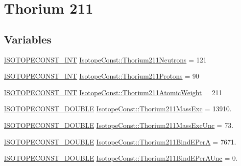 \hypertarget{group___isotope_const-_thorium-_th211}{}\section{Thorium 211}
\label{group___isotope_const-_thorium-_th211}
\subsection*{Variables}
\begin{DoxyCompactItemize}
\item 
\mbox{\hyperlink{group___isotope_const-_macros_ga5f18360b3e99483a35c32d789e62621c}{I\+S\+O\+T\+O\+P\+E\+C\+O\+N\+S\+T\+\_\+\+I\+NT}} \mbox{\hyperlink{group___isotope_const-_thorium-_th211_ga25dd33841264998a99dd8358d8dfa6ec}{Isotope\+Const\+::\+Thorium211\+Neutrons}} = 121
\item 
\mbox{\hyperlink{group___isotope_const-_macros_ga5f18360b3e99483a35c32d789e62621c}{I\+S\+O\+T\+O\+P\+E\+C\+O\+N\+S\+T\+\_\+\+I\+NT}} \mbox{\hyperlink{group___isotope_const-_thorium-_th211_gacf456f0d29e7d516234391a2c745e0ff}{Isotope\+Const\+::\+Thorium211\+Protons}} = 90
\item 
\mbox{\hyperlink{group___isotope_const-_macros_ga5f18360b3e99483a35c32d789e62621c}{I\+S\+O\+T\+O\+P\+E\+C\+O\+N\+S\+T\+\_\+\+I\+NT}} \mbox{\hyperlink{group___isotope_const-_thorium-_th211_ga47e62e238955244bdeec42ff20acdc3f}{Isotope\+Const\+::\+Thorium211\+Atomic\+Weight}} = 211
\item 
\mbox{\hyperlink{group___isotope_const-_macros_ga8f45a7272ce02c0b4c65c44636ed719a}{I\+S\+O\+T\+O\+P\+E\+C\+O\+N\+S\+T\+\_\+\+D\+O\+U\+B\+LE}} \mbox{\hyperlink{group___isotope_const-_thorium-_th211_ga2afe3014184f8b36f36249dd17d410e4}{Isotope\+Const\+::\+Thorium211\+Mass\+Exc}} = 13910.
\item 
\mbox{\hyperlink{group___isotope_const-_macros_ga8f45a7272ce02c0b4c65c44636ed719a}{I\+S\+O\+T\+O\+P\+E\+C\+O\+N\+S\+T\+\_\+\+D\+O\+U\+B\+LE}} \mbox{\hyperlink{group___isotope_const-_thorium-_th211_gab20157681b519292b8e6f9d0c318787a}{Isotope\+Const\+::\+Thorium211\+Mass\+Exc\+Unc}} = 73.
\item 
\mbox{\hyperlink{group___isotope_const-_macros_ga8f45a7272ce02c0b4c65c44636ed719a}{I\+S\+O\+T\+O\+P\+E\+C\+O\+N\+S\+T\+\_\+\+D\+O\+U\+B\+LE}} \mbox{\hyperlink{group___isotope_const-_thorium-_th211_ga944ffba4a670da8b84cb92af8c61f4e1}{Isotope\+Const\+::\+Thorium211\+Bind\+E\+PerA}} = 7671.
\item 
\mbox{\hyperlink{group___isotope_const-_macros_ga8f45a7272ce02c0b4c65c44636ed719a}{I\+S\+O\+T\+O\+P\+E\+C\+O\+N\+S\+T\+\_\+\+D\+O\+U\+B\+LE}} \mbox{\hyperlink{group___isotope_const-_thorium-_th211_ga80703050ad8fe2258233c6ed1b732cd2}{Isotope\+Const\+::\+Thorium211\+Bind\+E\+Per\+A\+Unc}} = 0.

\end{DoxyCompactItemize}
